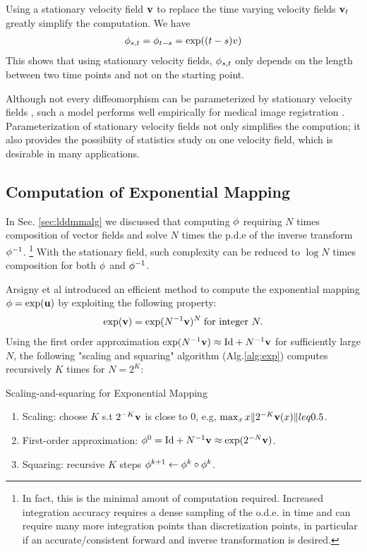 \documentclass[letterpaper,12pt]{article}
\begin{document}
Using a stationary velocity field $\mathbf{v}$ to replace the time varying velocity fields $\mathbf{v}_t$ greatly simplify the computation. We have
\begin{align}
\phi_{s,t} = \phi_{t-s} = \exp((t-s)v)
\end{align}
This shows that using stationary velocity fields, $\phi_{s,t}$ only depends on the length between two time points and not on the starting point. 

Although not every diffeomorphism can be parameterized by stationary velocity fields \cite{Ashburner2007}, such a model performs well empirically for medical image registration \cite{Hernandez2009, Vercauteren2009}. Parameterization of stationary velocity fields not only simplifies the compution; it also provides the possibiity of statistics study on one velocity field, which is desirable in many applications.



\subsection{Computation of Exponential Mapping}

In Sec. \ref{sec:lddmmalg} we discussed that computing $\phi$
requiring $N$ times composition of vector fields and solve $N$ times
the p.d.e of the inverse transform $\phi^{-1}$. \footnote{In fact,
  this is the minimal amout of computation required.  Increased
  integration accuracy requires a dense sampling of the o.d.e. in time
  and can require many more integration points than discretization
  points, in particular if an accurate/consistent forward and inverse
  transformation is desired.}  With the stationary field, such complexity can be reduced to $\log N$ times composition for both $\phi$ and $\phi^{-1}$. 

Arsigny et al \cite{Arsigny2006} introduced an efficient method to compute the exponential mapping $\phi = \exp(\mathbf{u})$ by exploiting the following property:
\begin{align}
\exp(\mathbf{v}) = \exp(N^{-1} \mathbf{v} )^N \;\text{for integer } N.
\end{align}
Using the first order approximation $\exp(N^{-1} \mathbf{v}) \approx \text{Id} + N^{-1}\mathbf{v}$ for sufficiently large $N$, the following "scaling and squaring" algorithm (Alg.\ref{alg:exp}) computes recursively $K$ times for $N = 2^K$:
\begin{algorithm}
\caption{Scaling-and-squaring for Exponential Mapping}
\label{alg:exp}
\begin{enumerate}
\item{Scaling: choose $K$ s.t $2^{-K}\mathbf{v}$ is close to 0, e.g, $\max_x x\|2^{-K}\mathbf{v}(x)\| leq 0.5 $. 
}
\item{First-order approximation: $\phi^{0} =  \text{Id} + N^{-1}\mathbf{v} \approx \exp(2^{-N} \mathbf{v}) $.
}
\item{Squaring: recursive $K$ steps $\phi^{k+1} \leftarrow \phi^{k} \circ \phi^{k}$. 
}
\end{enumerate}
\end{algorithm}
\end{document}
